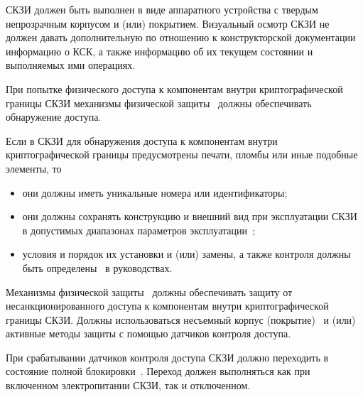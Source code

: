 %


\label{R.PS.Coating} %
СКЗИ должен быть выполнен в виде аппаратного устройства с твердым непрозрачным 
корпусом и (или) покрытием.
%
Визуальный осмотр СКЗИ не должен давать дополнительную по отношению 
к конструкторской документации~ информацию о КСК, 
а также информацию об их текущем состоянии и выполняемых ими операциях.


\label{R.PS.PassiveDetection} %
При попытке физического доступа к компонентам внутри 
криптографической границы СКЗИ механизмы физической защиты~ 
должны обеспечивать обнаружение доступа. 

\label{R.PS.PassiveDetectionId} %
Если в СКЗИ для обнаружения доступа к компонентам внутри криптографической 
границы предусмотрены печати, пломбы или иные подобные элементы, то 
\begin{itemize}
\item
они должны иметь уникальные номера или идентификаторы;
\item
они должны сохранять конструкцию и внешний вид при эксплуатации СКЗИ в допустимых 
диапазонах параметров эксплуатации~;
\item
условия и порядок их установки и (или) замены, а также контроля
должны быть определены~ в руководствах.
\end{itemize}


\label{R.PS.ActiveDetectionSensor} %
Механизмы физической защиты~ должны обеспечивать 
защиту от несанкционированного доступа к компонентам внутри 
криптографической границы СКЗИ. 
%
Должны использоваться несъемный корпус (покрытие)~ 
и (или) активные методы защиты с помощью датчиков контроля доступа.

\label{R.PS.Erasing} %
При срабатывании датчиков контроля доступа СКЗИ должно 
переходить в состояние полной блокировки~.
%
Переход должен выполняться как при включенном электропитании 
СКЗИ, так и отключенном.


